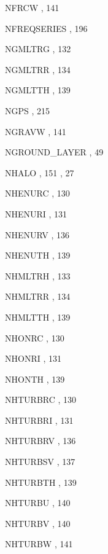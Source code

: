 \begin{theindex}
  \item NFRCW
    \subitem {},  141
  \item NFREQSERIES
    \subitem {},  196
  \item NGMLTRG
    \subitem {},  132
  \item NGMLTRR
    \subitem {},  134
  \item NGMLTTH
    \subitem {},  139
  \item NGPS
    \subitem {},  215
  \item NGRAVW
    \subitem {},  141
  \item NGROUND\_LAYER
    \subitem {},  49
  \item NHALO
    \subitem {},  151
    \subitem {},  27
  \item NHENURC
    \subitem {},  130
  \item NHENURI
    \subitem {},  131
  \item NHENURV
    \subitem {},  136
  \item NHENUTH
    \subitem {},  139
  \item NHMLTRH
    \subitem {},  133
  \item NHMLTRR
    \subitem {},  134
  \item NHMLTTH
    \subitem {},  139
  \item NHONRC
    \subitem {},  130
  \item NHONRI
    \subitem {},  131
  \item NHONTH
    \subitem {},  139
  \item NHTURBRC
    \subitem {},  130
  \item NHTURBRI
    \subitem {},  131
  \item NHTURBRV
    \subitem {},  136
  \item NHTURBSV
    \subitem {},  137
  \item NHTURBTH
    \subitem {},  139
  \item NHTURBU
    \subitem {},  140
  \item NHTURBV
    \subitem {},  140
  \item NHTURBW
    \subitem {},  141

\end{theindex}
